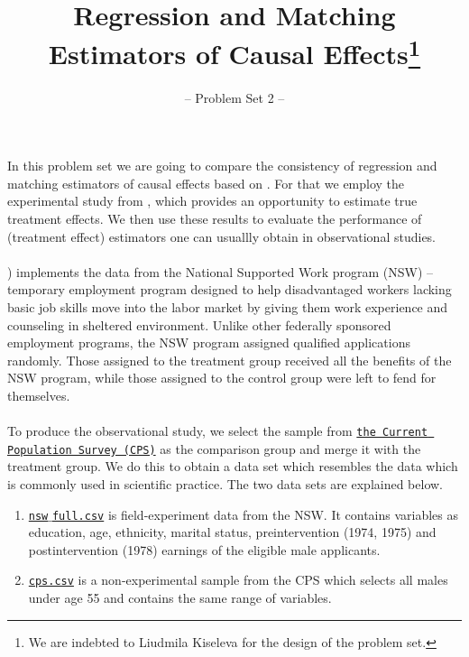 

\title{Regression and Matching Estimators of Causal Effects\thanks{We are indebted to Liudmila Kiseleva for the design of the problem set.}}
\subtitle{-- Problem Set 2 --}
\date{}

\maketitle\vspace{-2cm}

In this problem set we are going to compare the consistency of regression and matching estimators of causal effects based on \cite{Dehejia.1999}. For that we employ the experimental study from \cite{LaLonde.1986}, which provides an opportunity to estimate true treatment effects. We then use these results to evaluate the performance of (treatment effect) estimators one can usuallly obtain in observational studies. \\
\\
\cite{LaLonde.1986}) implements the data from the National Supported Work program (NSW) -- temporary employment program designed to help disadvantaged workers lacking basic job skills move into the labor market by giving them work experience and counseling in sheltered environment. Unlike other federally sponsored employment programs, the NSW program assigned qualified applications randomly. Those assigned to the treatment group received all the benefits of the NSW program, while those assigned to the control group were left to fend for themselves.\\
\\
To produce the observational study, we select the sample from \href{https://www.census.gov/programs-surveys/cps.html}{\texttt{the Current Population Survey (CPS)}} as the comparison group and merge it with the treatment group.
We do this to obtain a data set which resembles the data which is commonly used in scientific practice.
The two data sets are explained below.

\begin{enumerate}
 
\item \href{https://github.com/HumanCapitalAnalysis/microeconometrics/tree/master/problem-sets/02-matching-estimators/data}{\texttt{nsw$\_$full.csv}} is field-experiment data from the NSW.  It contains variables as education, age, ethnicity, marital status, preintervention (1974, 1975) and postintervention (1978) earnings of the eligible male applicants.  

\item \href{https://github.com/HumanCapitalAnalysis/microeconometrics/tree/master/problem-sets/02-matching-estimators/data}{\texttt{cps.csv}} is a non-experimental sample from the CPS which selects all males under age 55 and contains the same range of variables.

\end {enumerate}


